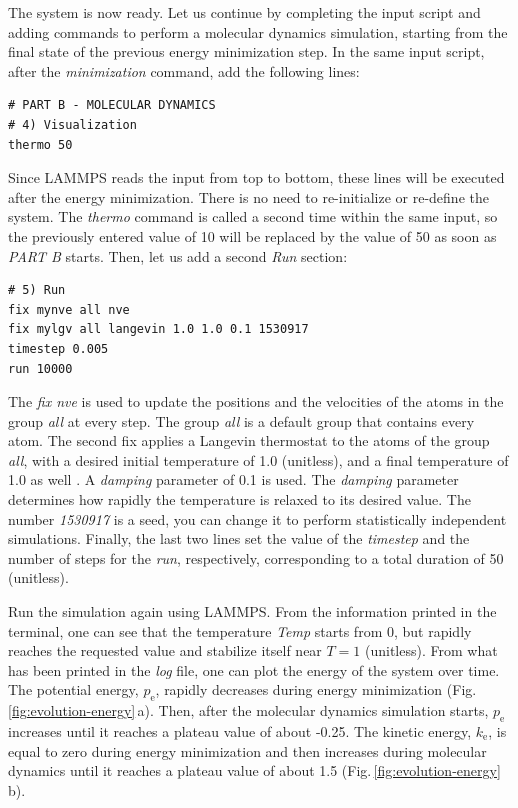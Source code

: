 \documentclass[9pt,tutorial]{livecoms}
\begin{document}
The system is now ready. Let us continue by completing the input script and adding commands to perform a molecular dynamics simulation, starting from the final state of the previous energy minimization step. In the same input script, after the \textit{minimization} command, add the following
lines:
{\normalsize \begin{verbatim}
# PART B - MOLECULAR DYNAMICS
# 4) Visualization
thermo 50
\end{verbatim}}
Since LAMMPS reads the input from top to bottom, these lines will be executed after the energy minimization. There is no need to re-initialize or re-define the system. The \textit{thermo} command is called a second time within the same input, so the previously entered value of 10 will be replaced by
the value of 50 as soon as \textit{PART B} starts. Then, let us add a second \textit{Run} section:
{\normalsize \begin{verbatim}
# 5) Run
fix mynve all nve
fix mylgv all langevin 1.0 1.0 0.1 1530917
timestep 0.005
run 10000
\end{verbatim}}
The \textit{fix nve} is used to update the positions and the velocities of the atoms in the group \textit{all} at every step. The group \textit{all} is a default group that contains every atom. The second fix applies a Langevin thermostat to the atoms of the group \textit{all}, with a desired initial temperature of 1.0 (unitless), and a final temperature of 1.0 as well \cite{schneider1978molecular}. A \textit{damping} parameter of 0.1 is used. The \textit{damping} parameter determines how rapidly the temperature is relaxed to its desired value. The number \textit{1530917} is a seed, you can change it to perform statistically independent simulations. Finally, the last two lines set the value of the \textit{timestep} and the number of steps for the \textit{run}, respectively, corresponding to a total duration of 50 (unitless).

Run the simulation again using LAMMPS. From the information printed in the terminal, one can see that the temperature \textit{Temp} starts from 0, but rapidly reaches the requested value and stabilize itself near $T=1$ (unitless). From what has been printed in the \textit{log} file, one can plot the energy of the system over time. The potential energy, $p_\text{e}$, rapidly decreases during energy minimization (Fig.\,\ref{fig:evolution-energy}\,a). Then, after the molecular dynamics simulation starts, $p_\text{e}$ increases until it reaches a plateau value of about -0.25. The kinetic energy, $k_\text{e}$, is equal to zero during energy minimization and then increases during molecular dynamics until it reaches a plateau value of about 1.5 (Fig.\,\ref{fig:evolution-energy}\,b).
\end{document}
